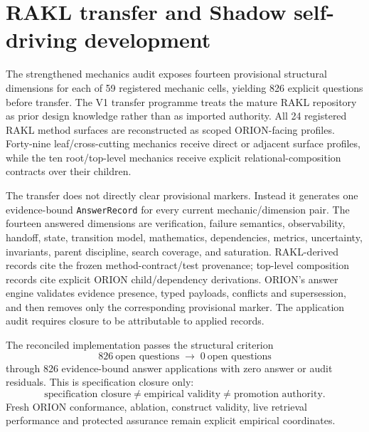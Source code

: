 \section{RAKL transfer and Shadow self-driving development}
The strengthened mechanics audit exposes fourteen provisional structural dimensions for each of 59 registered mechanic cells, yielding 826 explicit questions before transfer.  The V1 transfer programme treats the mature RAKL repository as prior design knowledge rather than as imported authority.  All 24 registered RAKL method surfaces are reconstructed as scoped ORION-facing profiles.  Forty-nine leaf/cross-cutting mechanics receive direct or adjacent surface profiles, while the ten root/top-level mechanics receive explicit relational-composition contracts over their children.

The transfer does not directly clear provisional markers.  Instead it generates one evidence-bound \texttt{AnswerRecord} for every current mechanic/dimension pair.  The fourteen answered dimensions are verification, failure semantics, observability, handoff, state, transition model, mathematics, dependencies, metrics, uncertainty, invariants, parent discipline, search coverage, and saturation.  RAKL-derived records cite the frozen method-contract/test provenance; top-level composition records cite explicit ORION child/dependency derivations.  ORION's answer engine validates evidence presence, typed payloads, conflicts and supersession, and then removes only the corresponding provisional marker.  The application audit requires closure to be attributable to applied records.

The reconciled implementation passes the structural criterion
\[
826\ \text{open questions}\;\longrightarrow\;0\ \text{open questions}
\]
through 826 evidence-bound answer applications with zero answer or audit residuals.  This is specification closure only:
\[
\text{specification closure} \neq \text{empirical validity} \neq \text{promotion authority}.
\]
Fresh ORION conformance, ablation, construct validity, live retrieval performance and protected assurance remain explicit empirical coordinates.

